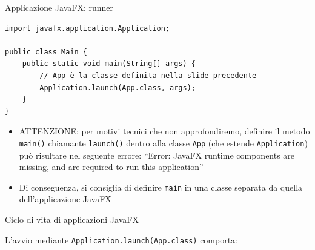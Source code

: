 \documentclass[xcolor=dvipsnames,presentation]{beamer}
\begin{document}
\begin{frame}[fragile]{Applicazione JavaFX: runner}

\begin{lstlisting}
import javafx.application.Application;

public class Main {
	public static void main(String[] args) { 
	    // App è la classe definita nella slide precedente
	    Application.launch(App.class, args); 
	}   
}
\end{lstlisting}
\begin{itemize}
\item ATTENZIONE: per motivi tecnici che non approfondiremo, definire il metodo \texttt{main()} chiamante \texttt{launch()} dentro alla classe \texttt{App} (che estende \texttt{Application}) può risultare nel seguente errore: {\color{red}``Error: JavaFX runtime components are missing, and are required to run this application''}
\item Di conseguenza, si consiglia di definire \texttt{main} in una classe separata da quella dell'applicazione JavaFX
\end{itemize}
\end{frame}

\begin{frame}{Ciclo di vita di applicazioni JavaFX}

L'avvio mediante \texttt{Application.launch(App.class)} comporta:

\end{frame}
\end{document}
